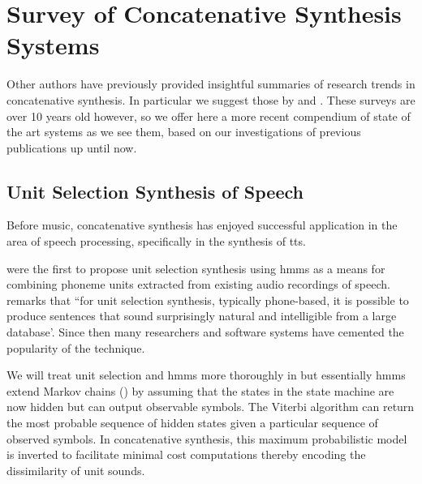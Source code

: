 \section{Survey of Concatenative Synthesis Systems}

Other authors have previously provided insightful summaries of research trends in concatenative synthesis. In particular we suggest those by \cite{Schwarz2005, Schwarz2006b} and \cite{Sturm2006}. These surveys are over 10 years old however, so we offer here a more recent compendium of state of the art systems as we see them, based on our investigations of previous publications up until now.

\subsection{Unit Selection Synthesis of Speech}

Before music, concatenative synthesis has enjoyed successful application in the area of speech processing, specifically in the synthesis of \acrfull{tts}.

\cite{Hunt1996} were the first to propose unit selection synthesis using \acrfull{hmm}s as a means for combining phoneme units extracted from existing audio recordings of speech. \cite{Conkie1999} remarks that ``for unit selection synthesis, typically phone-based, it is possible to produce sentences that sound surprisingly natural and intelligible from a large database'. Since then many researchers \citep{Conkie1999, balestri1999choose, schroder2001emotional, Tihelka2010, Lakkavalli2010} and software systems \citep{black1994chatr, beutnagel1999t, Young2002} have cemented the popularity of the technique.

We will treat unit selection and \acrshort{hmm}s more thoroughly in  but essentially \acrshort{hmm}s extend Markov chains () by assuming that the states in the state machine are now hidden but can output observable symbols. The Viterbi algorithm can return the most probable sequence of hidden states given a particular sequence of observed symbols. In concatenative synthesis, this maximum probabilistic model is inverted to facilitate minimal cost computations thereby encoding the dissimilarity of unit sounds.

